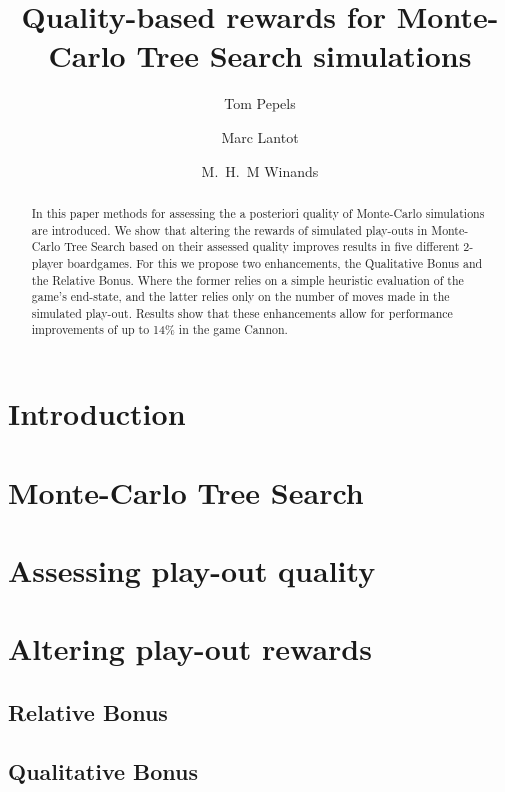 \documentclass{ecai2010}
\begin{document}
\title{Quality-based rewards for Monte-Carlo Tree Search simulations}

\author{Tom Pepels \and Marc Lantot \and M.~H.~M Winands  }

\maketitle


\begin{abstract}
In this paper methods for assessing the a posteriori quality of Monte-Carlo simulations are introduced. We show that altering the rewards of simulated play-outs in Monte-Carlo Tree Search based on their assessed quality improves results in five different 2-player boardgames. For this we propose two enhancements, the Qualitative Bonus and the Relative Bonus. Where the former relies on a simple heuristic evaluation of the game's end-state, and the latter relies only on the number of moves made in the simulated play-out. Results show that these enhancements allow for performance improvements of up to 14\% in the game Cannon. 
\end{abstract}

\section{Introduction}

\section{Monte-Carlo Tree Search}

\section{Assessing play-out quality}

\section{Altering play-out rewards}
\subsection{Relative Bonus}
\subsection{Qualitative Bonus}
\end{document}
